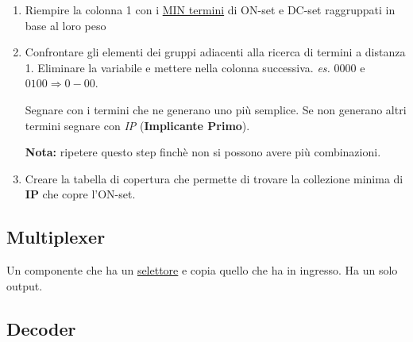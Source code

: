 \documentclass[../main.tex]{subfiles}
\begin{document}
\vspace{0.2cm}
\begin{enumerate}
    \item Riempire la colonna 1 con i \underline{MIN termini} di ON-set e DC-set raggruppati in base al loro peso
    \item Confrontare gli elementi dei gruppi adiacenti alla ricerca di termini a distanza 1. Eliminare la variabile e mettere nella
    colonna successiva. \textit{es.} $0000$ e $0100 \Rightarrow 0-00$. 

    Segnare con \checkmark i termini che ne generano uno più semplice. Se non generano altri termini segnare con \textit{IP} (\textbf{Implicante Primo}).
    
    \textbf{Nota:} ripetere questo step finchè non si possono avere più combinazioni.
    \item Creare la tabella di copertura che permette di trovare la collezione minima di \textbf{IP} che copre l'ON-set.
\end{enumerate}

\pagebreak
\subsection{Multiplexer}
Un componente che ha un \underline{selettore} e copia quello che ha in ingresso. Ha un solo output.


\subsection{Decoder}
\end{document}
